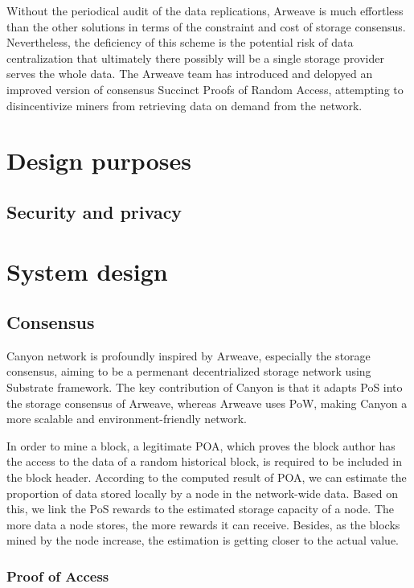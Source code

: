 \documentclass[]{article}
\begin{document}
Without the periodical audit of the data replications, Arweave is much effortless than the other solutions in terms of the constraint and cost of storage consensus. Nevertheless, the deficiency of this scheme is the potential risk of data centralization that ultimately there possibly will be a single storage provider serves the whole data. The Arweave team has introduced and delopyed an improved version of consensus Succinct Proofs of Random Access, attempting to disincentivize miners from retrieving data on demand from the network.

\section{Design purposes}

\subsection{Security and privacy}

\section{System design}

\subsection{Consensus}

Canyon network is profoundly inspired by Arweave, especially the storage consensus, aiming to be a permenant decentrialized storage network using Substrate framework. The key contribution of Canyon is that it adapts PoS into the storage consensus of Arweave, whereas Arweave uses PoW, making Canyon a more scalable and environment-friendly network.

In order to mine a block, a legitimate POA, which proves the block author has the access to the data of a random historical block, is required to be included in the block header. According to the computed result of POA, we can estimate the proportion of data stored locally by a node in the network-wide data. Based on this, we link the PoS rewards to the estimated storage capacity of a node. The more data a node stores, the more rewards it can receive. Besides, as the blocks mined by the node increase, the estimation is getting closer to the actual value.

\subsubsection{Proof of Access}
\end{document}
